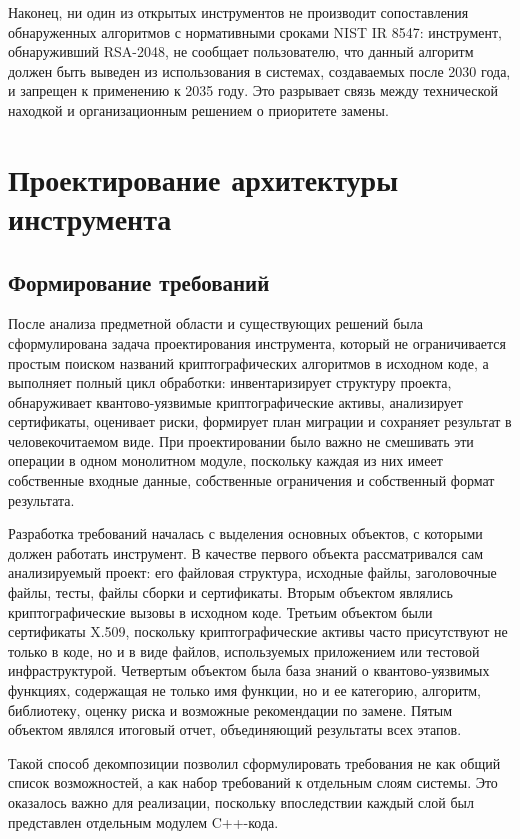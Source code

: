 \documentclass{itmo-vkr}
\begin{document}
	Наконец, ни один из открытых инструментов не производит сопоставления обнаруженных алгоритмов с нормативными сроками NIST IR 8547: инструмент, обнаруживший RSA-2048, не сообщает пользователю, что данный алгоритм должен быть выведен из использования в системах, создаваемых после 2030 года, и запрещен к применению к 2035 году. Это разрывает связь между технической находкой и организационным решением о приоритете замены.
	
	\section{Проектирование архитектуры инструмента}
	
	\subsection{Формирование требований}
	
	После анализа предметной области и существующих решений была сформулирована задача проектирования инструмента, который не ограничивается простым поиском названий криптографических алгоритмов в исходном коде, а выполняет полный цикл обработки: инвентаризирует структуру проекта, обнаруживает квантово-уязвимые криптографические активы, анализирует сертификаты, оценивает риски, формирует план миграции и сохраняет результат в человекочитаемом виде. При проектировании было важно не смешивать эти операции в одном монолитном модуле, поскольку каждая из них имеет собственные входные данные, собственные ограничения и собственный формат результата.
	
	Разработка требований началась с выделения основных объектов, с которыми должен работать инструмент. В качестве первого объекта рассматривался сам анализируемый проект: его файловая структура, исходные файлы, заголовочные файлы, тесты, файлы сборки и сертификаты. Вторым объектом являлись криптографические вызовы в исходном коде. Третьим объектом были сертификаты X.509, поскольку криптографические активы часто присутствуют не только в коде, но и в виде файлов, используемых приложением или тестовой инфраструктурой. Четвертым объектом была база знаний о квантово-уязвимых функциях, содержащая не только имя функции, но и ее категорию, алгоритм, библиотеку, оценку риска и возможные рекомендации по замене. Пятым объектом являлся итоговый отчет, объединяющий результаты всех этапов.
	
	Такой способ декомпозиции позволил сформулировать требования не как общий список возможностей, а как набор требований к отдельным слоям системы. Это оказалось важно для реализации, поскольку впоследствии каждый слой был представлен отдельным модулем C++-кода.
	
\end{document}
